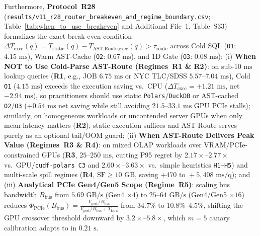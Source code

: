 \documentclass[10pt,a4paper]{article}
\begin{document}
Furthermore, \textbf{Protocol~R28} (\texttt{results/\allowbreak{}v11\_\allowbreak{}r28\_\allowbreak{}router\_\allowbreak{}breakeven\_\allowbreak{}and\_\allowbreak{}regime\_\allowbreak{}boundary.csv}; Table~\ref{tab:when_to_use_breakeven} and Additional File~1, Table~S33) formalizes the exact break-even condition $\Delta T_{\text{exec}}(q) = T_{\text{static}}(q) - T_{\text{AST-Route,exec}}(q) > \tau_{\text{route}}$ across Cold SQL (\texttt{O1}: $4.15\text{ ms}$), Warm AST-Cache (\texttt{O2}: $0.67\text{ ms}$), and 1D Gate (\texttt{O3}: $0.08\text{ ms}$): (i) \textbf{When NOT to Use Cold-Parse AST-Route (Regimes~R1 \& R2)}: on sub-$10\text{ ms}$ lookup queries (\textbf{R1}, e.g., JOB $6.75\text{ ms}$ or NYC TLC/SDSS $5.57\text{--}7.04\text{ ms}$), Cold \texttt{O1} ($4.15\text{ ms}$) exceeds the execution saving vs.\ CPU ($\Delta T_{\text{exec}}=+1.21\text{ ms}$, net $-2.94\text{ ms}$), so practitioners should use static \texttt{Polars}/\texttt{DuckDB} or AST-cached \texttt{O2}/\texttt{O3} ($+0.54\text{ ms}$ net saving while still avoiding $21.5\text{--}33.1\text{ ms}$ GPU PCIe stalls); similarly, on homogeneous workloads or uncontended server GPUs when only mean latency matters (\textbf{R2}), static execution suffices and AST-Route serves purely as an optional tail/OOM guard; (ii) \textbf{When AST-Route Delivers Peak Value (Regimes~R3 \& R4)}: on mixed OLAP workloads over VRAM/PCIe-constrained GPUs (\textbf{R3}, $25\text{--}250\text{ ms}$, cutting P95 regret by $2.17\times\text{--}2.77\times$ vs.\ GPU/\texttt{cudf-polars C3} and $2.60\times\text{--}3.63\times$ vs.\ simple heuristics \texttt{H1--H5}) and multi-scale spill regimes (\textbf{R4}, $\text{SF}\ge 10\text{ GB}$, saving $+470\text{ to }+5{,}408\text{ ms/q}$); and (iii) \textbf{Analytical PCIe Gen4/Gen5 Scope (Regime~R5)}: scaling bus bandwidth $B_{\text{bus}}$ from $5.69\text{ GB/s}$ (Gen4 $\times 4$) to $25\text{--}64\text{ GB/s}$ (Gen4/Gen5 $\times 16$) reduces $\Phi_{\text{PCIe}}(B_{\text{bus}}) = \frac{V_{\text{post}}/B_{\text{bus}}}{V_{\text{post}}/B_{\text{bus}}+T_{\text{kern}}}$ from $34.7\%$ to $10.8\%\text{--}4.5\%$, shifting the GPU crossover threshold downward by $3.2\times\text{--}5.8\times$, which $m=5$ canary calibration adapts to in $0.21\text{ s}$.
\end{document}
